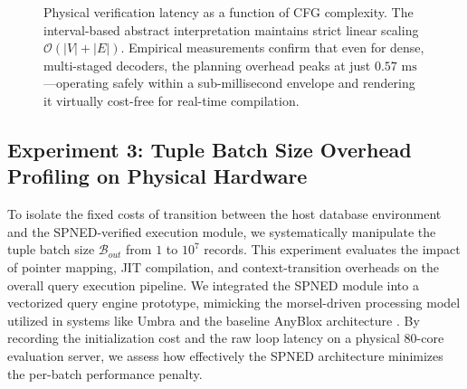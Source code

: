 \documentclass[onecolumn]{IEEEtran}
\numberwithin{equation}{section}
\theoremstyle{definition}
\theoremstyle{remark}
\begin{document}
\begin{figure}[htbp]
\centering
{}
\caption{Physical verification latency as a function of CFG complexity. The interval-based abstract interpretation maintains strict linear scaling $\mathcal{O}(|V| + |E|)$. Empirical measurements confirm that even for dense, multi-staged decoders, the planning overhead peaks at just $0.57\text{ ms}$—operating safely within a sub-millisecond envelope and rendering it virtually cost-free for real-time compilation.}
\label{fig:verifier_latency}
\end{figure}







\subsection{Experiment 3: Tuple Batch Size Overhead Profiling on Physical Hardware}

To isolate the fixed costs of transition between the host database environment and the SPNED-verified execution module, we systematically manipulate the tuple batch size $\mathcal{B}_{out}$ from $1$ to $10^7$ records. This experiment evaluates the impact of pointer mapping, JIT compilation, and context-transition overheads on the overall query execution pipeline. We integrated the SPNED module into a vectorized query engine prototype, mimicking the morsel-driven processing model utilized in systems like Umbra \cite{neumann2020umbra} and the baseline AnyBlox architecture \cite{gienieczko2025anyblox}. By recording the initialization cost and the raw loop latency on a physical 80-core evaluation server, we assess how effectively the SPNED architecture minimizes the per-batch performance penalty.
\end{document}
